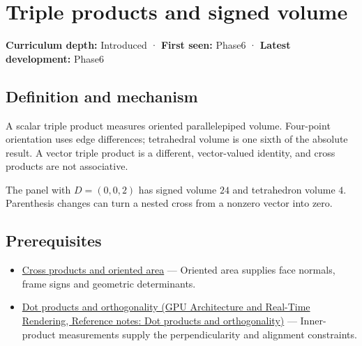 \hypertarget{appendix-5caa058bd9c7}{}\label{referencestart:appendix-5caa058bd9c7}
\section{Triple products and signed volume}\label{appendix-5caa058bd9c7-triple-products-and-signed-volume}

\hypertarget{appendix-5caa058bd9c7-triple-products-and-signed-volume}{}

\textbf{Curriculum depth:} Introduced · \textbf{First seen:} Phase6 · \textbf{Latest development:} Phase6

\begin{allmightroledefinition}

\subsection{Definition and mechanism}\label{appendix-5caa058bd9c7-definition-and-mechanism}

\hypertarget{appendix-5caa058bd9c7-definition-and-mechanism}{}

A scalar triple product measures oriented parallelepiped volume. Four-point orientation uses edge differences; tetrahedral volume is one sixth of the absolute result. A vector triple product is a different, vector-valued identity, and cross products are not associative.

\end{allmightroledefinition}

The panel with \(D=(0,0,2)\) has signed volume \(24\) and tetrahedron volume \(4\). Parenthesis changes can turn a nested cross from a nonzero vector into zero.

\subsection{Prerequisites}\label{appendix-5caa058bd9c7-prerequisites}

\hypertarget{appendix-5caa058bd9c7-prerequisites}{}

\begin{itemize}
\tightlist
\item
  \hyperref[appendix-2391db8052b1]{Cross products and oriented area} --- Oriented area supplies face normals, frame signs and geometric determinants.
\item
  \href{../06-GPU-Architecture-and-Real-Time-Rendering/main.pdf\#nameddest=appendix-8bc4e8fc547c}{Dot products and orthogonality (GPU Architecture and Real-Time Rendering, Reference notes: Dot products and orthogonality)} --- Inner-product measurements supply the perpendicularity and alignment constraints.
\end{itemize}

